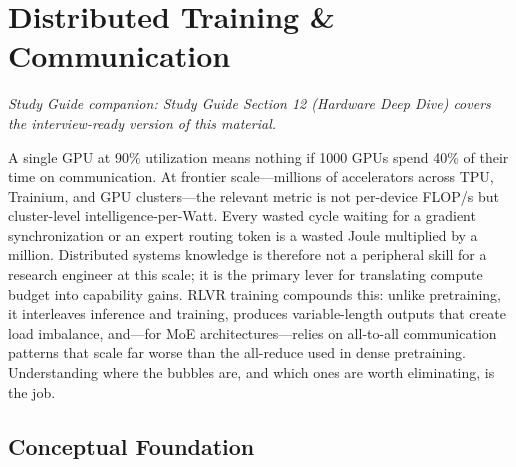 \section{Distributed Training \& Communication}

\smallskip\noindent\textit{Study Guide companion: Study Guide Section 12 (Hardware Deep Dive) covers the interview-ready version of this material.}
\smallskip

\begin{whythis}
A single GPU at 90\% utilization means nothing if 1000 GPUs spend 40\% of their time on communication.
At frontier scale---millions of accelerators across TPU, Trainium, and GPU clusters---the relevant metric
is not per-device FLOP/s but cluster-level intelligence-per-Watt.
Every wasted cycle waiting for a gradient synchronization or an expert routing token is a wasted Joule
multiplied by a million.
Distributed systems knowledge is therefore not a peripheral skill for a research engineer at this scale;
it is the primary lever for translating compute budget into capability gains.
RLVR training compounds this: unlike pretraining, it interleaves inference and training, produces
variable-length outputs that create load imbalance, and---for MoE architectures---relies on all-to-all
communication patterns that scale far worse than the all-reduce used in dense pretraining.
Understanding where the bubbles are, and which ones are worth eliminating, is the job.
\end{whythis}

\subsection*{Conceptual Foundation}

